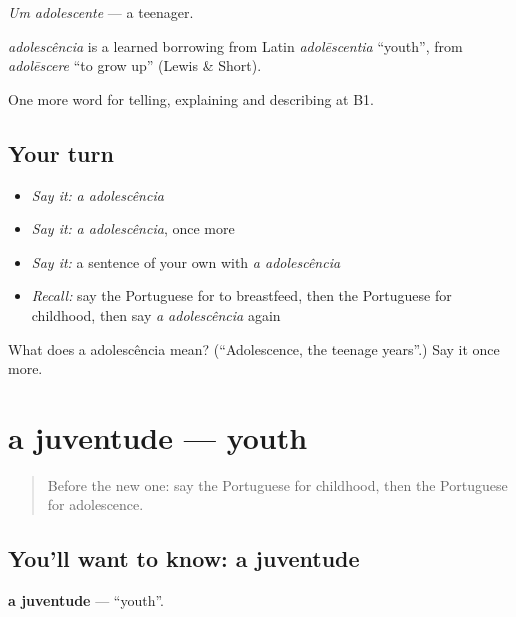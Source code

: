 \emph{Um adolescente} — a teenager.

\begin{cousinweb}
\emph{adolescência} is a learned borrowing from Latin \emph{adolēscentia} \textquotedblleft{}youth\textquotedblright{}, from \emph{adolēscere} \textquotedblleft{}to grow up\textquotedblright{} (Lewis \& Short).
\end{cousinweb}

\begin{grammarlens}[title={What you've built}]
One more word for telling, explaining and describing at B1.
\end{grammarlens}

\subsection*{Your turn}
\begin{itemize}
\raggedright
  \item \emph{Say it:} \emph{a adolescência}
  \item \emph{Say it:} \emph{a adolescência}, once more
  \item \emph{Say it:} a sentence of your own with \emph{a adolescência}
  \item \emph{Recall:} say the Portuguese for to breastfeed, then the Portuguese for childhood, then say \emph{a adolescência} again
\end{itemize}

\begin{tcolorbox}[breakable,colback=teal!4,colframe=teal!35!black,title={Before you move on}]
What does a adolescência mean? (\textquotedblleft{}Adolescence, the teenage years\textquotedblright{}.) Say it once more.
\end{tcolorbox}
\section[a juventude]{a juventude — youth}

\label{lesson:PT-C311-juventude}



\begin{quote}
Before the new one: say the Portuguese for childhood, then the Portuguese for adolescence.
\end{quote}

\subsection*{You'll want to know: a juventude}
\textbf{a juventude} — \textquotedblleft{}youth\textquotedblright{}.

